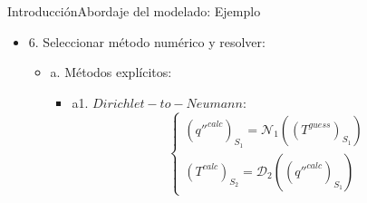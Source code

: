 \begin{frame}{Introducción}{Abordaje del modelado: Ejemplo}
\begin{itemize}
\item 6. Seleccionar método numérico y resolver: 
  \begin{itemize}
  \item a. Métodos explícitos:
    \begin{itemize}
    \item a1. $Dirichlet-to-Neumann$:
      \begin{equation*}
      \left\{\begin{matrix}
      (q''^{calc})_{S_1} = \mathscr{N}_1\left ((T^{guess})_{S_1}\right ) \\
      (T^{calc})_{S_2} = \mathscr{D}_2\left ((q''^{calc})_{S_1}\right )
      \end{matrix}\right.
      \end{equation*}
    \end{itemize}
  \end{itemize}
\end{itemize}

\end{frame}








